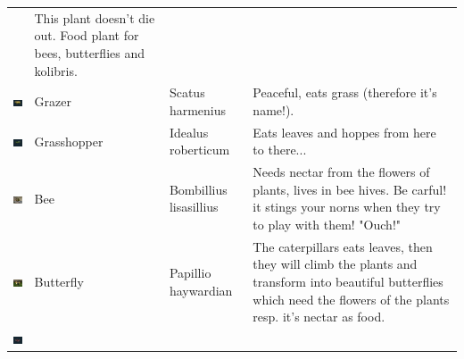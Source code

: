 \documentclass[11pt,twoside,a4paper]{article}
\begin{document}
\begin{longtable}{ p{1.60cm} p{1.95cm} p{2.55cm} p{11.00cm} }
																&	This plant doesn't die out. Food plant for bees, butterflies and kolibris.	\\
	\begin{minipage}[ht]{1.55cm} \includegraphics[width=1.50cm]{img/grazer.jpg} \end{minipage}		
																&	Grazer			&	Scatus \newline harmenius		
																&	Peaceful, eats grass (therefore it's name!).	\\
	\begin{minipage}[ht]{1.55cm} \includegraphics[width=1.50cm]{img/heug.jpg} \end{minipage}		
																&	Grasshopper		&	Idealus \newline roberticum		
																&	Eats leaves and hoppes from here to there...	\\
	\begin{minipage}[ht]{1.55cm} \includegraphics[width=1.50cm]{img/bien.jpg} \end{minipage}		
																&	Bee				&	Bombillius lisasillius		
																&	Needs nectar from the flowers of plants, lives in bee hives. Be carful! it stings your norns when they try to play with them! "Ouch!"	\\
	\begin{minipage}[ht]{1.55cm} \includegraphics[width=1.50cm]{img/schmet.jpg} \end{minipage}		
																&	Butterfly		&	Papillio \newline haywardian		
																&	The caterpillars eats leaves, then they will climb the plants and transform into beautiful butterflies which need the flowers of the plants resp. it's nectar as food.	\\
	\begin{minipage}[ht]{1.55cm} \includegraphics[width=1.50cm]{img/ameise.jpg} \end{minipage}		

\end{longtable}
\end{document}
